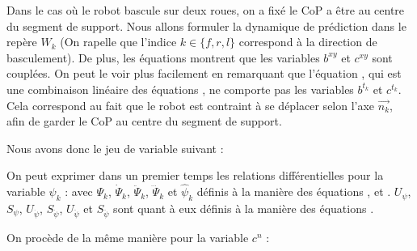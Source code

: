 				
					Dans le cas où le robot bascule sur deux roues, on a fixé le CoP a être au centre du segment de support.
					Nous allons formuler la dynamique de prédiction dans le repère $W_k$ (On rapelle que l'indice $k \in \{f, r, l\}$ correspond à la direction de basculement).
					De plus, les équations  montrent que les variables $b^{xy}$ et $c^{xy}$ sont couplées.
					On peut le voir plus facilement en remarquant que l'équation , qui est une combinaison linéaire des équations , ne comporte pas les variables $b^{t_k}$ et $c^{t_k}$.
					Cela correspond au fait que le robot est contraint à se déplacer selon l'axe $\vec{n_k}$, afin de garder le CoP au centre du segment de support.
					
					Nous avons donc le jeu de variable suivant :
					
					On peut exprimer dans un premier temps les relations différentielles pour la variable $\psi_k$ :
					avec $\Psi_k$, $\dot{\Psi}_k $, $\ddot{\Psi}_k$, $\dddot{\Psi}_k$ et $\hat{\psi}_k$ définis 
					à la manière des équations ,  et .
					$U_\psi$, $S_\psi$, $U_{\dot{\psi}}$, $S_{\dot{\psi}}$, $U_{\ddot{\psi}}$ et $S_{\ddot{\psi}}$ sont quant à eux définis à la manière des équations
					  .
					
					On procède de la même manière pour la variable $c^n$ :
					
					
